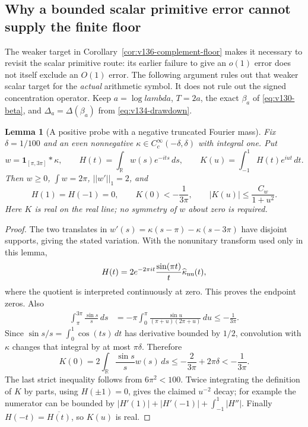 \documentclass[11pt]{article}
\def\lambda{lambda}%
\def\norm#1{||#1||}%
\newtheorem{lemma}[theorem]{Lemma}
\theoremstyle{remark}
\newcommand{\norm}[1]{\left\lVert #1\right\rVert}
\begin{document}
\subsection{Why a bounded scalar primitive error cannot supply the finite floor}

The weaker target in Corollary~\ref{cor:v136-complement-floor} makes it
necessary to revisit the scalar primitive route: its earlier failure to
give an $o(1)$ error does not itself exclude an $O(1)$ error. The following
argument rules out that weaker scalar target for the \emph{actual}
arithmetic symbol. It does not rule out the signed concentration operator.
Keep $a=\log\lambda$, $T=2a$, the exact $\beta_a$ of
\eqref{eq:v130-beta}, and $\Delta_a=\Delta(\beta_a)$ from
\eqref{eq:v134-drawdown}.

\begin{lemma}[A positive probe with a negative truncated Fourier mass]
\label{lem:v137-probe}
Fix $\delta=1/100$ and an even nonnegative
$\kappa\in C_c^\infty(-\delta,\delta)$ with integral one. Put
\[
 w=\mathbf1_{[\pi,3\pi]}*\kappa,\qquad
 H(t)=\int_{\mathbb R}w(s)e^{-its}\,ds,\qquad
 K(u)=\int_{-1}^1H(t)e^{iut}\,dt.
\]
Then $w\ge0$, $\int w=2\pi$, $\norm{w'}_1=2$, and
\begin{equation}\label{eq:v137-probe-properties}
 H(1)=H(-1)=0,\qquad
 K(0)<-\frac1{3\pi},\qquad
 |K(u)|\le\frac{C_w}{1+u^2}.
\end{equation}
Here $K$ is real on the real line; no symmetry of $w$ about zero is
required.
\end{lemma}
\begin{proof}
The two translates in $w'(s)=\kappa(s-\pi)-\kappa(s-3\pi)$ have
disjoint supports, giving the stated variation. With the nonunitary
transform used only in this lemma,
\[
 H(t)=2e^{-2\pi it}\frac{\sin(\pi t)}{t}\widehat\kappa_{\rm nu}(t),
\]
where the quotient is interpreted continuously at zero. This proves
the endpoint zeros. Also
\begin{align*}
 \int_\pi^{3\pi}\frac{\sin s}{s}\,ds
 &=-\pi\int_0^\pi
       \frac{\sin u}{(\pi+u)(2\pi+u)}\,du
 \le-\frac1{3\pi}.
\end{align*}
Since $\sin s/s=\int_0^1\cos(ts)\,dt$ has derivative bounded by
$1/2$, convolution with $\kappa$ changes that integral by at most
$\pi\delta$. Therefore
\[
 K(0)=2\int_{\mathbb R}\frac{\sin s}{s}w(s)\,ds
 \le-\frac2{3\pi}+2\pi\delta<-\frac1{3\pi}.
\]
The last strict inequality follows from $6\pi^2<100$.
Twice integrating the definition of $K$ by parts, using $H(\pm1)=0$,
gives the claimed $u^{-2}$ decay; for example the numerator can be
bounded by $|H'(1)|+|H'(-1)|+\int_{-1}^1|H''|$.
Finally $H(-t)=\overline{H(t)}$, so $K(u)$ is real.
\end{proof}
\end{document}
